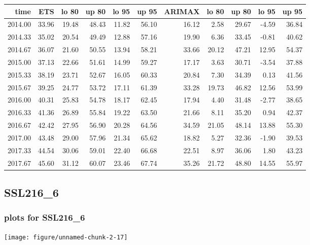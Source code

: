 \documentclass[10pt,a4paper]{article}\usepackage[]{graphicx}\usepackage[]{color}
\makeatletter
\def\maxwidth{ %
  \ifdim\Gin@nat@width>\linewidth
    \linewidth
  \else
    \Gin@nat@width
  \fi
}
\newcommand{\AaA}{\_}
\makeatother
\begin{document}
\begin{table}[ht]
\centering
\begin{tabular}{rrrrrrrrrrr}
  \hline
time & ETS  & lo 80 & up 80 & lo 95 & up 95 & ARIMAX  & lo 80 & up 80 & lo 95 & up 95 \\ 
  \hline
2014.00 & 33.96 & 19.48 & 48.43 & 11.82 & 56.10 & 16.12 & 2.58 & 29.67 & -4.59 & 36.84 \\ 
  2014.33 & 35.02 & 20.54 & 49.49 & 12.88 & 57.16 & 19.90 & 6.36 & 33.45 & -0.81 & 40.62 \\ 
  2014.67 & 36.07 & 21.60 & 50.55 & 13.94 & 58.21 & 33.66 & 20.12 & 47.21 & 12.95 & 54.37 \\ 
  2015.00 & 37.13 & 22.66 & 51.61 & 14.99 & 59.27 & 17.17 & 3.63 & 30.71 & -3.54 & 37.88 \\ 
  2015.33 & 38.19 & 23.71 & 52.67 & 16.05 & 60.33 & 20.84 & 7.30 & 34.39 & 0.13 & 41.56 \\ 
  2015.67 & 39.25 & 24.77 & 53.72 & 17.11 & 61.39 & 33.28 & 19.73 & 46.82 & 12.56 & 53.99 \\ 
  2016.00 & 40.31 & 25.83 & 54.78 & 18.17 & 62.45 & 17.94 & 4.40 & 31.48 & -2.77 & 38.65 \\ 
  2016.33 & 41.36 & 26.89 & 55.84 & 19.22 & 63.50 & 21.66 & 8.11 & 35.20 & 0.94 & 42.37 \\ 
  2016.67 & 42.42 & 27.95 & 56.90 & 20.28 & 64.56 & 34.59 & 21.05 & 48.14 & 13.88 & 55.30 \\ 
  2017.00 & 43.48 & 29.00 & 57.96 & 21.34 & 65.62 & 18.82 & 5.27 & 32.36 & -1.90 & 39.53 \\ 
  2017.33 & 44.54 & 30.06 & 59.01 & 22.40 & 66.68 & 22.51 & 8.97 & 36.06 & 1.80 & 43.23 \\ 
  2017.67 & 45.60 & 31.12 & 60.07 & 23.46 & 67.74 & 35.26 & 21.72 & 48.80 & 14.55 & 55.97 \\ 
   \hline
\end{tabular}
\end{table}

\newpage
\subsection{SSL216\AaA 6}
\subsubsection{plots for SSL216\AaA 6}

\texttt{[image: figure/unnamed-chunk-2-17]} 
\end{document}
